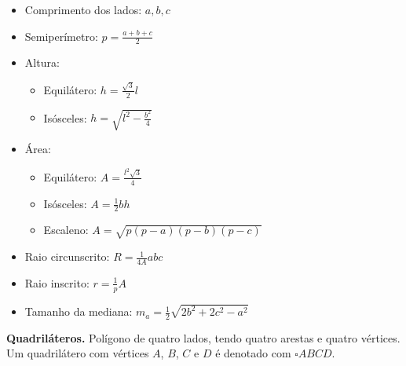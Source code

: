 \begin{multicols}{2}
	\begin{itemize}
		\item Comprimento dos lados: $a,b,c$
		\item Semiperímetro: $p = \frac{a+b+c}{2}$
		\item Altura:
		\begin{itemize}
			\item Equilátero: $h = \frac{\sqrt{3}}{2}l$
			\item Isósceles: $h = \sqrt{l^2 - \frac{b^2}{4}}$
		\end{itemize}
		\item Área:
		\begin{itemize}
			\item Equilátero: $A =\frac{l^2\sqrt{3}}{4}$
			\item Isósceles: $A =\frac{1}{2} bh$
			\item Escaleno: $A =\sqrt{p(p-a)(p-b)(p-c)}$
		\end{itemize}
		\item Raio circunscrito: $R = \frac{1}{4A}abc$
		\item Raio inscrito: $r = \frac{1}{p}A$
		\item Tamanho da mediana: $m_a = \frac{1}{2}\sqrt{2b^2+2c^2-a^2}$
	\end{itemize}
\end{multicols}

\noindent \textbf{Quadriláteros.} Polígono de quatro lados, tendo quatro arestas e quatro vértices. Um quadrilátero com vértices $A$, $B$, $C$ e $D$ é denotado com $\square ABCD$.

